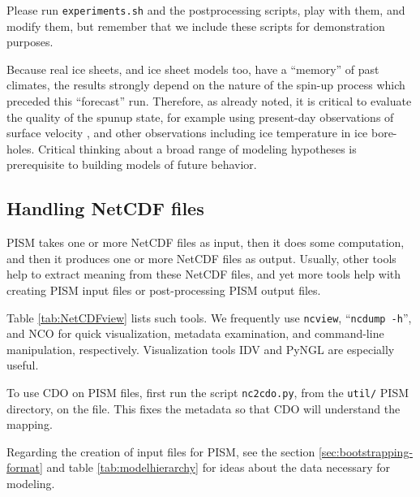 Please run \verb|experiments.sh| and the postprocessing scripts, play with them, and modify them, but remember that we include these scripts for demonstration purposes.

Because real ice sheets, and ice sheet models too, have a ``memory'' of past climates, the results strongly depend on the nature of the spin-up process which preceded this ``forecast'' run.  Therefore, as already noted, it is critical to evaluate the quality of the spunup state, for example using present-day observations of surface velocity \cite{AschwandenAdalgeirsdottirKhroulev}, and other observations including ice temperature in ice bore-holes.  Critical thinking about a broad range of modeling hypotheses is prerequisite to building models of future behavior.


\subsection{Handling NetCDF files}\label{subsect:nctoolsintro}  PISM takes one or more NetCDF files as input, then it does some computation, and then it produces one or more NetCDF files as output.  Usually, other tools help to extract meaning from these NetCDF files, and yet more tools help with creating PISM input files or post-processing PISM output files.

Table \ref{tab:NetCDFview} lists such tools.  We frequently use \texttt{ncview}, ``\texttt{ncdump -h}'', and NCO for quick visualization, metadata examination, and command-line manipulation, respectively.  Visualization tools IDV and PyNGL are especially useful.  

To use CDO on PISM files, first run the script \texttt{nc2cdo.py}, from the \texttt{util/} PISM directory, on the file.  This fixes the metadata so that CDO will understand the mapping.

Regarding the creation of input files for PISM, see the section \ref{sec:bootstrapping-format} and table \ref{tab:modelhierarchy} for ideas about the data necessary for modeling.


